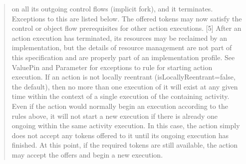 \begin{quotation}
on all its outgoing control flows (implicit fork), and it terminates. Exceptions to this are listed below. The offered tokens
may now satisfy the control or object flow prerequisites for other action executions.
[5] After an action execution has terminated, its resources may be reclaimed by an implementation, but the details of resource
management are not part of this specification and are properly part of an implementation profile.
See ValuePin and Parameter for exceptions to rule for starting action execution.
If an action is not locally reentrant (isLocallyReentrant=false, the default), then no more than one execution of it will
exist at any given time within the context of a single execution of the containing activity. Even if the action would
normally begin an execution according to the rules above, it will not start a new execution if there is already one ongoing
within the same activity execution. In this case, the action simply does not accept any tokens offered to it until its ongoing
execution has finished. At this point, if the required tokens are still available, the action may accept the offers and begin
a new execution.




\end{quotation}
